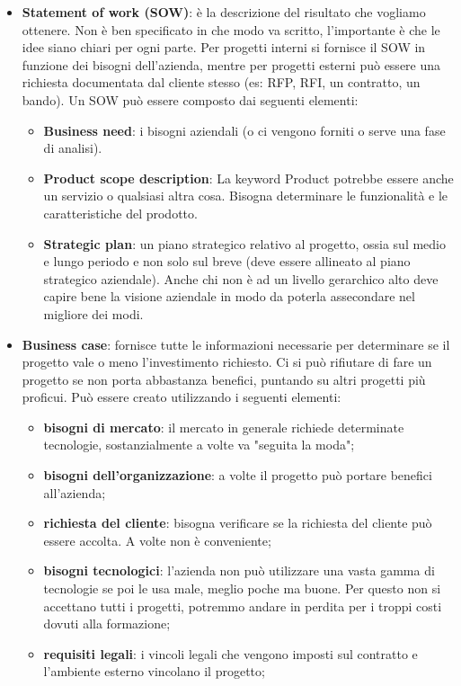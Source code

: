 \begin{itemize}
	\item \textbf{Statement of work (SOW)}: è la descrizione del risultato che vogliamo ottenere. Non è ben specificato in che modo va scritto, l'importante è che le idee siano chiari per ogni parte.
	Per progetti interni si fornisce il SOW in funzione dei bisogni dell'azienda, mentre per progetti esterni può essere una richiesta documentata dal cliente stesso (es: RFP, RFI, un contratto, un bando). Un SOW può essere composto dai seguenti elementi:
	\begin{itemize}
		\item \textbf{Business need}: i bisogni aziendali (o ci vengono forniti o serve una fase di analisi).
		\item \textbf{Product scope description}: La keyword Product potrebbe essere anche un servizio o qualsiasi altra cosa. Bisogna determinare le funzionalità e le caratteristiche del prodotto.
		\item \textbf{Strategic plan}: un piano strategico relativo al progetto, ossia sul medio e lungo periodo e non solo sul breve (deve essere allineato al piano strategico aziendale). Anche chi non è ad un livello gerarchico alto deve capire bene la visione  aziendale in modo da poterla assecondare nel migliore dei modi.
	\end{itemize}
	\item \textbf{Business case}: fornisce tutte le informazioni necessarie per determinare se il progetto vale o meno l'investimento richiesto. Ci si può rifiutare di fare un progetto se non porta abbastanza benefici, puntando su altri progetti più proficui. Può essere creato utilizzando i seguenti elementi:
	\begin{itemize}
		\item \textbf{bisogni di mercato}: il mercato in generale richiede determinate tecnologie, sostanzialmente a volte va "seguita la moda";
		\item \textbf{bisogni dell'organizzazione}: a volte il progetto può portare benefici all'azienda;
		\item \textbf{richiesta del cliente}:  bisogna verificare se la richiesta del cliente può essere accolta. A volte non è conveniente;
		\item \textbf{bisogni tecnologici}: l'azienda non può utilizzare una vasta gamma di tecnologie se poi le usa male, meglio poche ma buone. Per questo non si accettano tutti i progetti, potremmo andare in perdita per i troppi costi dovuti alla formazione;
		\item \textbf{requisiti legali}: i vincoli legali che vengono imposti sul contratto e l'ambiente esterno vincolano il progetto;

\end{itemize}
\end{itemize}
